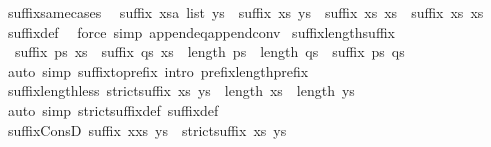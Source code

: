 \begin{isabellebody}
\endisatagproof
{\isafoldproof}%
%
\isadelimproof
\isanewline
%
\endisadelimproof
\isanewline
{}\isamarkupfalse%
\ suffix{\isacharunderscore}same{\isacharunderscore}cases{\isacharcolon}\isanewline
\ \ {\isachardoublequoteopen}suffix\ {\isacharparenleft}xsa\ list{\isacharparenright}\ ys\ {\isasymLongrightarrow}\ suffix\ xs\ ys\ {\isasymLongrightarrow}\ suffix\ xs\ xs\ {\isasymor}\ suffix\ xs\ xs\isanewline
%
\isadelimproof
\ \ %
\endisadelimproof
%
\isatagproof
{}\isamarkupfalse%
\ suffix{\isacharunderscore}def\ \isamarkupfalse%
\ {\isacharparenleft}force\ simp{\isacharcolon}\ append{\isacharunderscore}eq{\isacharunderscore}append{\isacharunderscore}conv{}{\isacharparenright}%
\endisatagproof
{\isafoldproof}%
%
\isadelimproof
\isanewline
%
\endisadelimproof
\isanewline
{}\isamarkupfalse%
\ suffix{\isacharunderscore}length{\isacharunderscore}suffix{\isacharcolon}\isanewline
\ \ {\isachardoublequoteopen}suffix\ ps\ xs\ {\isasymLongrightarrow}\ suffix\ qs\ xs\ {\isasymLongrightarrow}\ length\ ps\ {\isasymle}\ length\ qs\ {\isasymLongrightarrow}\ suffix\ ps\ qs{\isachardoublequoteclose}\isanewline
%
\isadelimproof
\ \ %
\endisadelimproof
%
\isatagproof
{}\isamarkupfalse%
\ {\isacharparenleft}auto\ simp{\isacharcolon}\ suffix{\isacharunderscore}to{\isacharunderscore}prefix\ intro{\isacharcolon}\ prefix{\isacharunderscore}length{\isacharunderscore}prefix{\isacharparenright}%
\endisatagproof
{\isafoldproof}%
%
\isadelimproof
\isanewline
%
\endisadelimproof
\isanewline
{}\isamarkupfalse%
\ suffix{\isacharunderscore}length{\isacharunderscore}less{\isacharcolon}\ {\isachardoublequoteopen}strict{\isacharunderscore}suffix\ xs\ ys\ {\isasymLongrightarrow}\ length\ xs\ {\isacharless}\ length\ ys{\isachardoublequoteclose}\isanewline
%
\isadelimproof
\ \ %
\endisadelimproof
%
\isatagproof
{}\isamarkupfalse%
\ {\isacharparenleft}auto\ simp{\isacharcolon}\ strict{\isacharunderscore}suffix{\isacharunderscore}def\ suffix{\isacharunderscore}def{\isacharparenright}%
\endisatagproof
{\isafoldproof}%
%
\isadelimproof
\isanewline
%
\endisadelimproof
\isanewline
{}\isamarkupfalse%
\ suffix{\isacharunderscore}ConsD{\isacharprime}{\isacharcolon}\ {\isachardoublequoteopen}suffix\ {\isacharparenleft}x{\isacharhash}xs{\isacharparenright}\ ys\ {\isasymLongrightarrow}\ strict{\isacharunderscore}suffix\ xs\ ys{\isachardoublequoteclose}\isanewline

\end{isabellebody}
